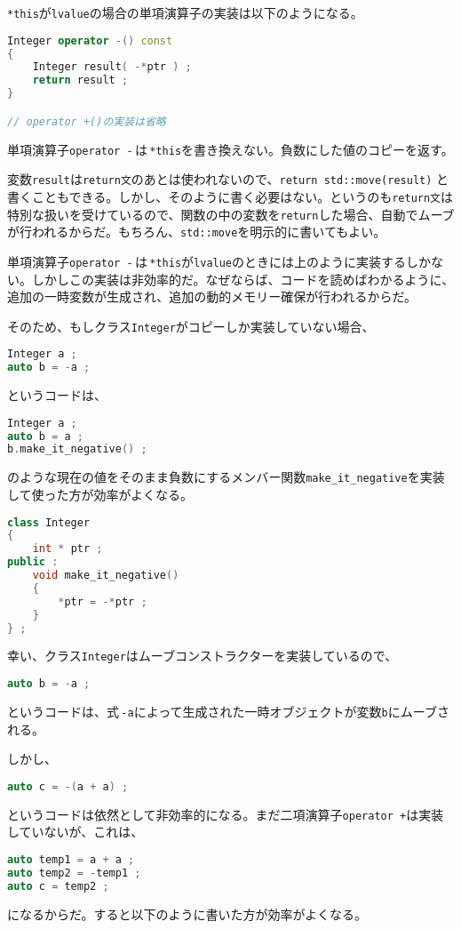 \texttt{*this}が\texttt{lvalue}の場合の単項演算子の実装は以下のようになる。

\begin{lstlisting}[language={C++}]
Integer operator -() const
{
    Integer result( -*ptr ) ;
    return result ;
}

// operator +()の実装は省略
\end{lstlisting}

単項演算子\texttt{operator -}\,は\,\texttt{*this}を書き換えない。負数にした値のコピーを返す。

変数\texttt{result}は\texttt{return文}のあとは使われないので、\texttt{return std::move(result)} と書くこともできる。しかし、そのように書く必要はない。というのも\texttt{return文}は特別な扱いを受けているので、関数の中の変数を\texttt{return}した場合、自動でムーブが行われるからだ。もちろん、\texttt{std::move}を明示的に書いてもよい。

単項演算子\texttt{operator -}\,は\,\texttt{*this}が\texttt{lvalue}のときには上のように実装するしかない。しかしこの実装は非効率的だ。なぜならば、コードを読めばわかるように、追加の一時変数が生成され、追加の動的メモリー確保が行われるからだ。

そのため、もしクラス\texttt{Integer}がコピーしか実装していない場合、
\begin{lstlisting}[language={C++}]
Integer a ;
auto b = -a ;
\end{lstlisting}
というコードは、
\begin{lstlisting}[language={C++}]
Integer a ;
auto b = a ;
b.make_it_negative() ; 
\end{lstlisting}
のような現在の値をそのまま負数にするメンバー関数\texttt{make\_it\_negative}を実装して使った方が効率がよくなる。

\begin{lstlisting}[language={C++}]
class Integer 
{
    int * ptr ;
public :
    void make_it_negative()
    {
        *ptr = -*ptr ;
    }
} ;
\end{lstlisting}

幸い、クラス\texttt{Integer}はムーブコンストラクターを実装しているので、
\begin{lstlisting}[language={C++}]
auto b = -a ;
\end{lstlisting}
というコードは、式\,\texttt{-a}によって生成された一時オブジェクトが変数\texttt{b}にムーブされる。

しかし、
\begin{lstlisting}[language={C++}]
auto c = -(a + a) ;
\end{lstlisting}
というコードは依然として非効率的になる。まだ二項演算子\texttt{operator +}は実装していないが、これは、
\begin{lstlisting}[language={C++}]
auto temp1 = a + a ;
auto temp2 = -temp1 ;
auto c = temp2 ;
\end{lstlisting}
になるからだ。すると以下のように書いた方が効率がよくなる。

